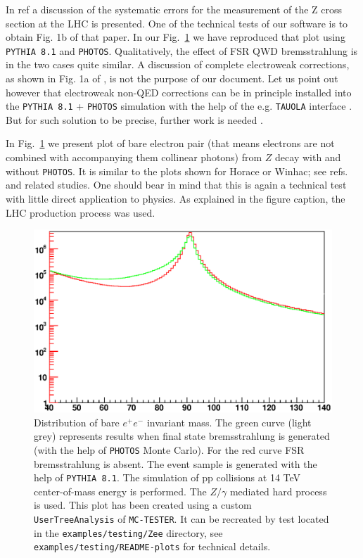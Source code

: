 \documentclass[]{Photos_interface_design}
\begin{document}
In ref \cite{Adam:2008ge} a discussion of the systematic errors for the measurement of the Z cross 
section at the LHC is presented. One of the technical tests of our software is to obtain
Fig. 1b of that paper. In our Fig.~\ref{fig:lineshape} we have 
reproduced that plot using {\tt PYTHIA 8.1} and {\tt PHOTOS}. Qualitatively, the effect
of FSR QWD bremsstrahlung is in the two cases quite similar. A discussion
of complete electroweak corrections, as shown in Fig. 1a of  \cite{Adam:2008ge},
is not the purpose of our document. Let us point out however that electroweak 
non-QED corrections can be in principle installed into the {\tt PYTHIA 8.1} + {\tt PHOTOS} simulation with 
the help of the e.g. {\tt TAUOLA} interface \cite{Davidson:2010rw}.
But for such solution to be precise, further work is needed \cite{Bardin-private}.

In  Fig.~\ref{fig:lineshape} we present  plot of bare electron pair 
(that means electrons are not combined with accompanying them collinear photons) from $Z$
 decay with and without {\tt PHOTOS}. It is similar to
the plots shown for Horace or Winhac; see refs.~\cite{CarloniCalame:2003ux,Winhac} and related
studies.
One should bear in mind that this is again a technical test with little 
direct application to physics. As explained in the figure caption, the LHC production process was used.
\begin{figure}[h!]
\centering
\includegraphics[scale=0.85]{lineshape.eps}
\caption{Distribution of bare $e^+e^-$ invariant mass. The green curve 
(light grey) represents results when final state 
bremsstrahlung is generated (with the help of {\tt PHOTOS} Monte Carlo). For the red curve FSR 
bremsstrahlung is absent. The event sample is generated with the help of {\tt PYTHIA 8.1}.
The simulation of pp collisions at 14 TeV center-of-mass energy is performed.
The $Z/\gamma$ mediated hard process is used.
This plot has been created using a custom {\tt UserTreeAnalysis} of {\tt MC-TESTER}.
It can be recreated by  test located in the {\tt examples/testing/Zee} directory, see  {\tt examples/testing/README-plots} for technical details.
\label{fig:lineshape}
}
\end{figure}
\end{document}
